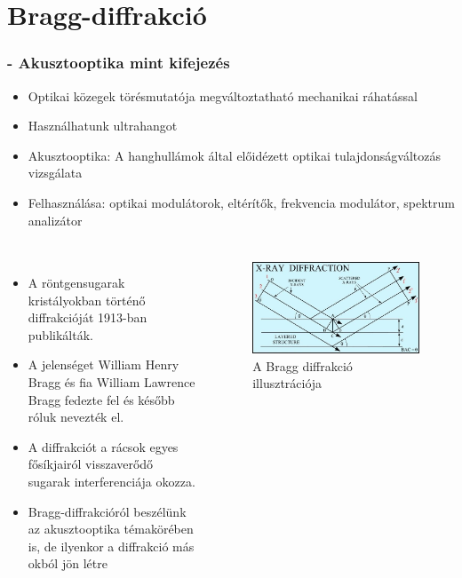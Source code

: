 \documentclass[aspectratio=169]{beamer}
\begin{document}
\section{Bragg-diffrakció}
\begin{frame}
\frametitle{\secname - Akusztooptika mint kifejezés}
\begin{itemize}
\item Optikai közegek törésmutatója megváltoztatható mechanikai ráhatással
\item Használhatunk ultrahangot
\item Akusztooptika: A hanghullámok által előidézett optikai tulajdonságváltozás vizsgálata
\item Felhasználása: optikai modulátorok, eltérítők, frekvencia modulátor, spektrum analizátor
\end{itemize}
\end{frame}
\begin{frame}
\frametitle{\secname}
\begin{columns}
\begin{itemize}
\item A röntgensugarak kristályokban történő diffrakcióját 1913-ban publikálták.
\item A jelenséget William Henry Bragg és fia William Lawrence Bragg fedezte fel és később róluk nevezték el.
\item A diffrakciót a rácsok egyes fősíkjairól visszaverődő sugarak interferenciája okozza.
\item Bragg-diffrakcióról beszélünk az akusztooptika témakörében is, de ilyenkor a diffrakció más okból jön létre
\end{itemize}
\begin{figure}
\includegraphics[width=.9\textwidth]{xrd6.jpg}
\caption{A Bragg diffrakció illusztrációja}
\end{figure}
\end{columns}
\end{frame}
\end{document}
